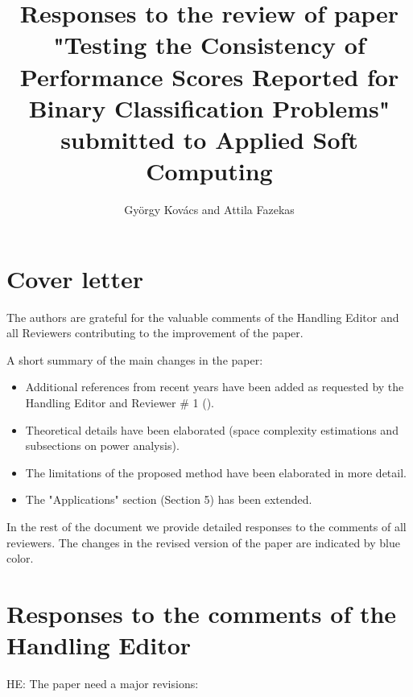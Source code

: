 \documentclass{article}
\title{Responses to the review of paper "Testing the Consistency of Performance Scores Reported for Binary Classification Problems" submitted to Applied Soft Computing}
\author{Gy\"orgy Kov\'acs and Attila Fazekas}
\begin{document}
%
%
%


\maketitle

\section{Cover letter}


The authors are grateful for the valuable comments of the Handling Editor and all Reviewers contributing to the improvement of the paper.

A short summary of the main changes in the paper:
\begin{itemize}
\item Additional references from recent years have been added as requested by the Handling Editor and Reviewer \# 1 (\cite{add0, add1, add2}).
\item Theoretical details have been elaborated (space complexity estimations and subsections on power analysis).
\item The limitations of the proposed method have been elaborated in more detail.
\item The "Applications" section (Section 5) has been extended.
\end{itemize}

\noindent In the rest of the document we provide detailed responses to the comments of all reviewers. {\color{blue} The changes in the revised version of the paper are indicated by blue color.}




\section{Responses to the comments of the Handling Editor}

HE: The paper need a major revisions:
\end{document}
